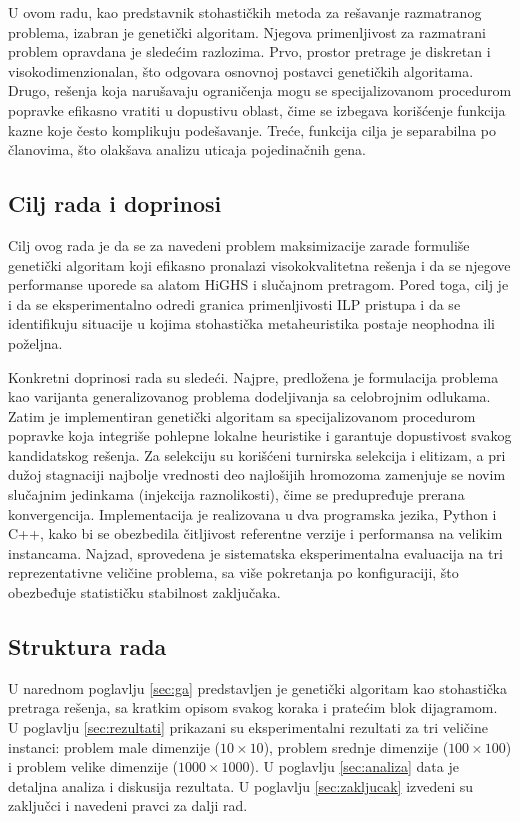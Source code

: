 \documentclass[12pt]{article}
\begin{document}
U ovom radu, kao predstavnik stohastičkih metoda za rešavanje razmatranog problema, izabran je genetički algoritam. Njegova primenljivost za razmatrani problem opravdana je sledećim razlozima. Prvo, prostor pretrage je diskretan i visokodimenzionalan, što odgovara osnovnoj postavci genetičkih algoritama. Drugo, rešenja koja narušavaju ograničenja mogu se specijalizovanom procedurom popravke \cite{Michalewicz1996} efikasno vratiti u dopustivu oblast, čime se izbegava korišćenje funkcija kazne koje često komplikuju podešavanje. Treće, funkcija cilja je separabilna po članovima, što olakšava analizu uticaja pojedinačnih gena.

\subsection{Cilj rada i doprinosi}

Cilj ovog rada je da se za navedeni problem maksimizacije zarade formuliše genetički algoritam koji efikasno pronalazi visokokvalitetna rešenja i da se njegove performanse uporede sa alatom HiGHS i slučajnom pretragom. Pored toga, cilj je i da se eksperimentalno odredi granica primenljivosti ILP pristupa i da se identifikuju situacije u kojima stohastička metaheuristika postaje neophodna ili poželjna.

Konkretni doprinosi rada su sledeći. Najpre, predložena je formulacija problema kao varijanta generalizovanog problema dodeljivanja sa celobrojnim odlukama. Zatim je implementiran genetički algoritam sa specijalizovanom procedurom popravke koja integriše pohlepne lokalne heuristike i garantuje dopustivost svakog kandidatskog rešenja. Za selekciju su korišćeni turnirska selekcija i elitizam, a pri dužoj stagnaciji najbolje vrednosti deo najlošijih hromozoma zamenjuje se novim slučajnim jedinkama (injekcija raznolikosti), čime se predupređuje prerana konvergencija. Implementacija je realizovana u dva programska jezika, Python i C++, kako bi se obezbedila čitljivost referentne verzije i performansa na velikim instancama. Najzad, sprovedena je sistematska eksperimentalna evaluacija na tri reprezentativne veličine problema, sa više pokretanja po konfiguraciji, što obezbeđuje statističku stabilnost zaključaka.

\subsection{Struktura rada}

U narednom poglavlju \ref{sec:ga} predstavljen je genetički algoritam kao stohastička pretraga rešenja, sa kratkim opisom svakog koraka i pratećim blok dijagramom. U poglavlju \ref{sec:rezultati} prikazani su eksperimentalni rezultati za tri veličine instanci: problem male dimenzije ($10 \times 10$), problem srednje dimenzije ($100 \times 100$) i problem velike dimenzije ($1000 \times 1000$). U poglavlju \ref{sec:analiza} data je detaljna analiza i diskusija rezultata. U poglavlju \ref{sec:zakljucak} izvedeni su zaključci i navedeni pravci za dalji rad.
\end{document}
